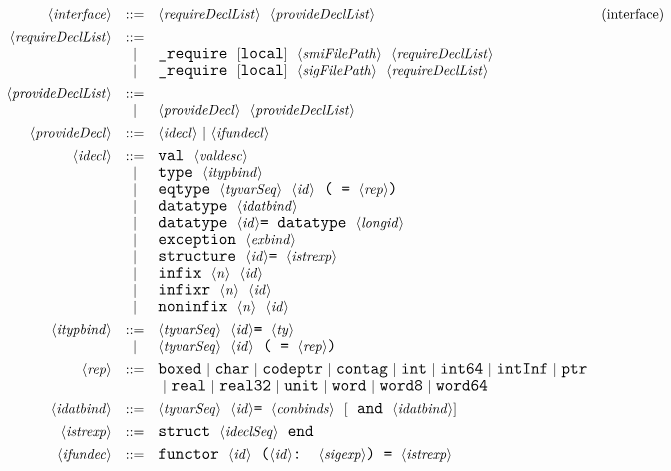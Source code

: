 \documentclass{jbook}
\newcommand{\code}[1]{\mbox{\large\tt #1}}
\newcommand{\vbar}{\mbox{\ $|$\ }}
\newcommand{\nonterm}[1]{\mbox{$\langle$}{\it #1}\mbox{$\rangle$}}
\newcommand{\sep}{\mbox{\ \ }}
\begin{document}
\[
\begin{array}{rcll}
\nonterm{interface} &::=& 
\nonterm{requireDeclList}\mbox{\ \ }\nonterm{provideDeclList} & \mbox{(interface)}
\\[1ex]
\nonterm{requireDeclList} &::=& \\
&|& \code{\_require}\sep [\code{local}] \sep\nonterm{smiFilePath}\sep \nonterm{requireDeclList}\\
&|& \code{\_require}\sep [\code{local}] \sep\nonterm{sigFilePath}\sep \nonterm{requireDeclList}
\\[1ex]
\nonterm{provideDeclList} &::=& \\
&|& \nonterm{provideDecl}\sep \nonterm{provideDeclList}
\\[1ex]
\nonterm{provideDecl} &::=& \nonterm{idecl} \vbar \nonterm{ifundecl}
\\[1ex]
\nonterm{idecl} &::=& \code{val}\sep\nonterm{valdesc}\\
&|& \code{type}\sep\nonterm{itypbind}\\
&|& \code{eqtype}\sep\nonterm{tyvarSeq}\sep\nonterm{id}\sep\code{( = }\nonterm{rep}\code{)}\\
&|& \code{datatype}\sep\nonterm{idatbind}\\
&|& \code{datatype}\sep\nonterm{id}\code{ = datatype}\sep\nonterm{longid}\\
&|& \code{exception}\sep\nonterm{exbind}\\
&|& \code{structure}\sep\nonterm{id}\code{ = }\nonterm{istrexp}\\
&|& \code{infix}\sep\nonterm{n}\sep\nonterm{id}\\
&|& \code{infixr}\sep\nonterm{n}\sep\nonterm{id}\\
&|& \code{noninfix}\sep\nonterm{n}\sep\nonterm{id}
\\[1ex]
\nonterm{itypbind} &::=& \nonterm{tyvarSeq}\sep\nonterm{id}\code{ = }\nonterm{ty}\\
        &|& \nonterm{tyvarSeq}\sep\nonterm{id}\sep \code{( = }\nonterm{rep} \code{)}
\\[1ex]
\nonterm{rep} &::=& \code{boxed}
\ |\ \code{char}
\ |\ \code{codeptr}
\ |\ \code{contag}
\ |\ \code{int}
\ |\ \code{int64}
\ |\ \code{intInf}
\ |\ \code{ptr}
\\&&
\ |\ \code{real}
\ |\ \code{real32}
\ |\ \code{unit}
\ |\ \code{word}
\ |\ \code{word8}
\ |\ \code{word64}
\\[1ex]
\nonterm{idatbind} &::=& \nonterm{tyvarSeq}\sep\nonterm{id} \code{ = }
    \nonterm{conbinds}\sep $[$\sep\code{and}\sep\nonterm{idatbind} $]$
\\[1ex]
\nonterm{istrexp} 
 &::=& \code{struct}\sep\nonterm{ideclSeq}\sep\code{end}
\\[1ex]
\nonterm{ifundec}
 &::=& \code{functor}\sep\nonterm{id}\sep\code{(}\nonterm{id}\code{ : }\nonterm{sigexp}\code{)  = }\nonterm{istrexp}
\end{array}
\]
\end{document}
